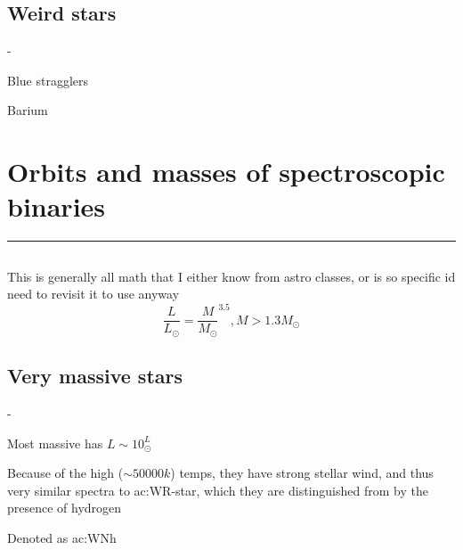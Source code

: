 \section{Weird stars}
\begin{list}{-}{}
\item Blue stragglers
\item Barium 
\end{list}


\pagebreak
\chapter{Orbits and masses of spectroscopic binaries}
\hrule
\vspace{.5cm}

\setcounter{subsection}{3}
\section{}
This is generally all math that I either know from astro classes, or is so specific id need to revisit it to use anyway\\

\[\frac{L}{L_\odot} = \frac{M}{M_\odot}^{3.5}, M > 1.3M_\odot\]

\section{Very massive stars}
\begin{list}{-}{}
\item Most massive has \(L \sim 10^ L_\odot\)
\item Because of the high (\(\sim50000k\)) temps, they have strong stellar wind, and thus very similar spectra to \gls{ac:WR-star}, which they are distinguished from by the presence of hydrogen 
\item Denoted as \gls{ac:WNh}
\end{list}

